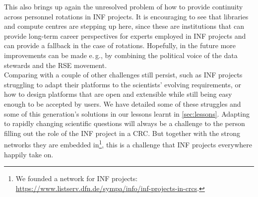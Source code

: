 \documentclass{eceasst}
\newcommand{\eg}{e.\,g.}
\begin{document}
This also brings up again the unresolved problem of how to provide continuity across personnel rotations in INF projects.
It is encouraging to see that libraries and compute centres are stepping up here, since these are institutions that
can provide long-term career perspectives for experts employed in INF projects and can provide a fallback in the case of rotations.
Hopefully, in the future more improvements can be made \eg, by combining the political voice of the data stewards and the RSE movement.\\
Comparing with \cite{mueckschel2006} a couple of other challenges still persist, such as INF projects struggling
to adapt their platforms to the scientists’ evolving requirements, or how to design platforms that are open and extensible
while still being easy enough to be accepted by users.
We have detailed some of these struggles and some of this generation’s solutions in our lessons learnt in \autoref{sec:lessons}.
Adapting to rapidly changing scientific questions will always be a challenge to the person filling out the role of the INF project in a CRC.
But together with the strong networks they are embedded in\footnote{
We founded a network for INF projects: \url{https://www.listserv.dfn.de/sympa/info/inf-projects-in-crcs}.
}, this is a challenge that INF projects everywhere happily take on.
\end{document}
